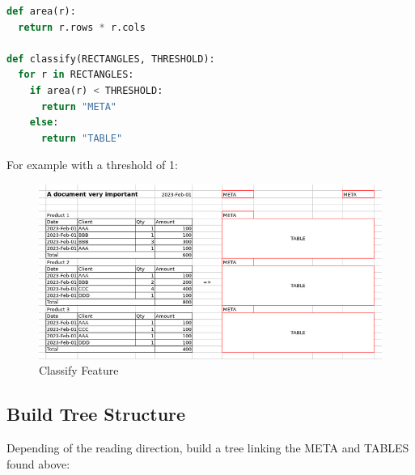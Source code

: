 \documentclass{article}
\begin{document}
\begin{lstlisting}[language=Python, caption=Spreadsheet To Bitmap]
def area(r):
  return r.rows * r.cols
  
def classify(RECTANGLES, THRESHOLD):
  for r in RECTANGLES:
    if area(r) < THRESHOLD:
      return "META"
    else:
      return "TABLE"
\end{lstlisting}

For example with a threshold of 1:

\begin{figure}[H]
\caption{Classify Feature}
\includegraphics[width=\columnwidth]{classify_features}
\end{figure}

\subsection{Build Tree Structure}
Depending of the reading direction, build a tree linking the META and TABLES found above:
\end{document}
